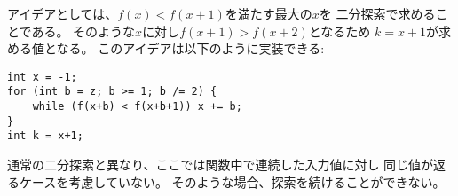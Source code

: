 \begin{comment}
The idea is to use binary search
for finding the largest value of $x$
for which $f(x)<f(x+1)$.
This implies that $k=x+1$
because $f(x+1)>f(x+2)$.
The following code implements the search: 
\end{comment}

アイデアとしては、$f(x)<f(x+1)$を満たす最大の$x$を
二分探索で求めることである。
そのような$x$に対し$f(x+1)>f(x+2)$となるため
$k=x+1$が求める値となる。
このアイデアは以下のように実装できる:

\begin{lstlisting}
int x = -1;
for (int b = z; b >= 1; b /= 2) {
    while (f(x+b) < f(x+b+1)) x += b;
}
int k = x+1;
\end{lstlisting}

\begin{comment}
Note that unlike in the ordinary binary search,
here it is not allowed that consecutive values
of the function are equal.
In this case it would not be possible to know
how to continue the search.
\end{comment}

通常の二分探索と異なり、ここでは関数中で連続した入力値に対し
同じ値が返るケースを考慮していない。
そのような場合、探索を続けることができない。
